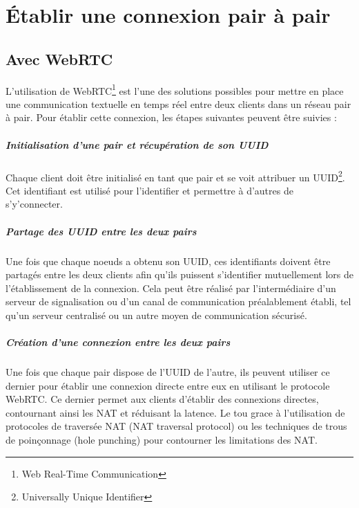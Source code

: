 \chapter{Établir une connexion pair à pair}

\section{Avec WebRTC}

L'utilisation de WebRTC\footnote{Web Real-Time Communication} est l'une des solutions possibles pour mettre en place une communication textuelle en temps réel entre deux clients dans un réseau pair à pair.
Pour établir cette connexion, les étapes suivantes peuvent être suivies :

\paragraph{Initialisation d'une pair et récupération de son UUID}

Chaque client doit être initialisé en tant que pair et se voit attribuer un UUID\footnote{Universally Unique Identifier}. Cet identifiant est utilisé pour l'identifier et permettre à d'autres de s'y'connecter.

\paragraph{Partage des UUID entre les deux pairs}

Une fois que chaque noeuds a obtenu son UUID, ces identifiants doivent être partagés entre les deux clients afin qu'ils puissent s'identifier mutuellement lors de l'établissement de la connexion. 
Cela peut être réalisé par l'intermédiaire d'un serveur de signalisation ou d'un canal de communication préalablement établi, tel qu'un serveur centralisé ou un autre moyen de communication sécurisé.

\paragraph{Création d'une connexion entre les deux pairs}

Une fois que chaque pair dispose de l'UUID de l'autre, ils peuvent utiliser ce dernier pour établir une connexion directe entre eux en utilisant le protocole WebRTC. Ce dernier permet aux clients d'établir des connexions directes,
contournant ainsi les NAT et réduisant la latence. Le tou grace à l'utilisation de protocoles de traversée NAT (NAT traversal protocol) ou les techniques de trous de poinçonnage (hole punching) pour contourner les limitations des NAT.

